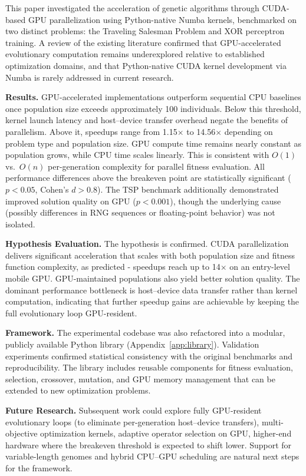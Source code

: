 \documentclass[14pt,a4paper]{extarticle}
\begin{document}
This paper investigated the acceleration of genetic algorithms through CUDA-based GPU parallelization using Python-native Numba kernels, benchmarked on two distinct problems: the Traveling Salesman Problem and XOR perceptron training. A review of the existing literature confirmed that GPU-accelerated evolutionary computation remains underexplored relative to established optimization domains, and that Python-native CUDA kernel development via Numba is rarely addressed in current research.

\bigskip\textbf{Results.} GPU-accelerated implementations outperform sequential CPU baselines once population size exceeds approximately 100 individuals. Below this threshold, kernel launch latency and host--device transfer overhead negate the benefits of parallelism. Above it, speedups range from 1.15$\times$ to 14.56$\times$ depending on problem type and population size. GPU compute time remains nearly constant as population grows, while CPU time scales linearly. This is consistent with $O(1)$ vs.\ $O(n)$ per-generation complexity for parallel fitness evaluation. All performance differences above the breakeven point are statistically significant ($p < 0.05$, Cohen's $d > 0.8$). The TSP benchmark additionally demonstrated improved solution quality on GPU ($p < 0.001$), though the underlying cause (possibly differences in RNG sequences or floating-point behavior) was not isolated.

\bigskip\textbf{Hypothesis Evaluation.} The hypothesis is confirmed. CUDA parallelization delivers significant acceleration that scales with both population size and fitness function complexity, as predicted - speedups reach up to 14$\times$ on an entry-level mobile GPU. GPU-maintained populations also yield better solution quality. The dominant performance bottleneck is host--device data transfer rather than kernel computation, indicating that further speedup gains are achievable by keeping the full evolutionary loop GPU-resident.

\bigskip\textbf{Framework.} The experimental codebase was also refactored into a modular, publicly available Python library (Appendix~\ref{app:library}). Validation experiments confirmed statistical consistency with the original benchmarks and reproducibility. The library includes reusable components for fitness evaluation, selection, crossover, mutation, and GPU memory management that can be extended to new optimization problems.

\bigskip\textbf{Future Research.} Subsequent work could explore fully GPU-resident evolutionary loops (to eliminate per-generation host--device transfers), multi-objective optimization kernels, adaptive operator selection on GPU, higher-end hardware where the breakeven threshold is expected to shift lower. Support for variable-length genomes and hybrid CPU--GPU scheduling are natural next steps for the framework.
\end{document}
